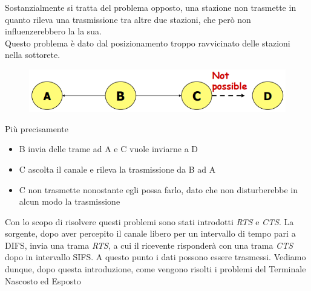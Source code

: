 \documentclass{article}
\newcounter{subsubsubsection}[subsubsection]
\begin{document}
                    Sostanzialmente si tratta del problema opposto, una stazione non trasmette in quanto rileva una trasmissione tra altre due stazioni, che però non influenzerebbero la la sua.\\
                    Questo problema è dato dal posizionamento troppo ravvicinato delle stazioni nella sottorete.
                    \begin{figure}[H]
                        \centering
                        \includegraphics[width=\textwidth]{pic/terminale_esposto.png}
                        \label{Problema del Terminale Esposto}
                    \end{figure}
                    Più precisamente
                    \begin{itemize}
                        \item B invia delle trame ad A e C vuole inviarne a D
                        \item C ascolta il canale e rileva la trasmissione da B ad A
                        \item C non trasmette nonostante egli possa farlo, dato che non disturberebbe in alcun modo la trasmissione
                    \end{itemize}

                    Con lo scopo di risolvere questi problemi sono stati introdotti \textit{RTS} e \textit{CTS}.
                    La sorgente, dopo aver percepito il canale libero per un intervallo di tempo pari a DIFS, invia una trama \textit{RTS}, a cui il ricevente risponderà con una trama \textit{CTS} dopo in intervallo SIFS. A questo punto i dati possono essere trasmessi.
                    Vediamo dunque, dopo questa introduzione, come vengono risolti i problemi del Terminale Nascosto ed Esposto
\end{document}
